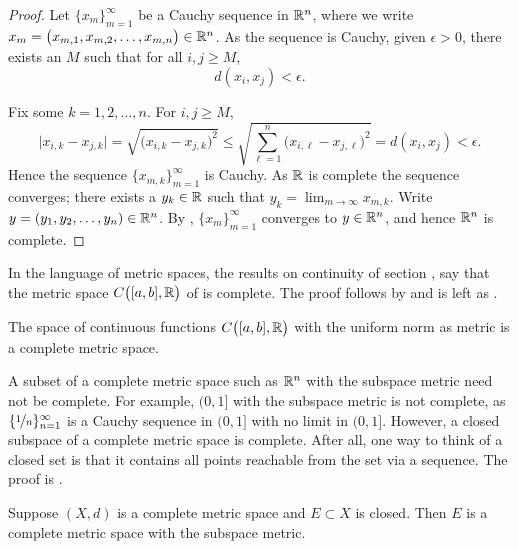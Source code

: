 \begin{proof}
Let $\{ x_m \}_{m=1}^\infty$ be a Cauchy sequence
in ${\mathbb{R}}^n$, where we write $x_m = \bigl(x_{m,1},x_{m,2},\ldots,x_{m,n}\bigr) \in {\mathbb{R}}^n$.
As the sequence is Cauchy, given $\epsilon > 0$, there exists an $M$ such that for all
$i,j \geq M$,
\begin{equation*}
d(x_i,x_j) < \epsilon.
\end{equation*}

Fix some $k=1,2,\ldots,n$.  For $i,j \geq M$,
\begin{equation*}
\bigl\lvert x_{i,k} - x_{j,k} \bigr\rvert
=
\sqrt{{\bigl(x_{i,k} - x_{j,k}\bigr)}^2}
\leq
\sqrt{\sum_{\ell=1}^n {\bigl(x_{i,\ell}-x_{j,\ell}\bigr)}^2}
= d(x_i,x_j) < \epsilon .
\end{equation*}
Hence the sequence $\{ x_{m,k} \}_{m=1}^\infty$ is Cauchy.  As ${\mathbb{R}}$ is
complete the sequence converges; there exists a $y_k \in {\mathbb{R}}$ such that
$y_k = \lim_{m\to\infty} x_{m,k}$.
Write $y = (y_1,y_2,\ldots,y_n) \in {\mathbb{R}}^n$.
By , $\{ x_m \}_{m=1}^\infty$ converges
to $y \in {\mathbb{R}}^n$, and hence ${\mathbb{R}}^n$ is complete.
\end{proof}

In the language of metric spaces,
the results on continuity of section ,
say that the metric space
$C\bigl([a,b],{\mathbb{R}}\bigr)$ of  is complete.
The proof follows by  
and is left as .

\begin{prop} \label{prop:CabRcomplete}
The space of continuous functions $C\bigl([a,b],{\mathbb{R}}\bigr)$ with the uniform
norm as metric is a complete metric space.
\end{prop}

A subset of a complete metric space such as ${\mathbb{R}}^n$ with the subspace metric need not be
complete.  For example, $(0,1]$ with the subspace metric is not
complete, as $\{ \nicefrac{1}{n} \}_{n=1}^\infty$ is a Cauchy sequence in $(0,1]$
with no limit in $(0,1]$.
However, 
a closed subspace of a complete metric space is
complete.  After all, one way
to think of a closed set is that it contains all points
reachable from the set via a sequence.
The proof is 
.

\begin{prop} \label{prop:closedcomplete}
Suppose $(X,d)$ is a complete metric space and $E \subset X$
is closed.
Then $E$ is a complete metric space with the subspace metric.
\end{prop}

